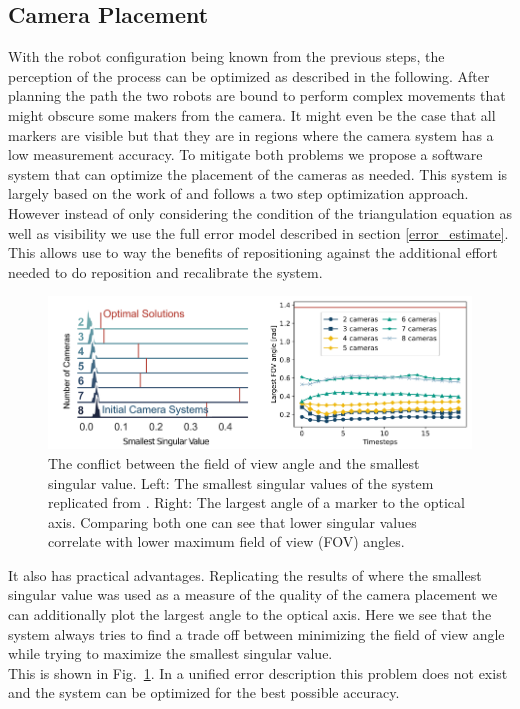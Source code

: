 \documentclass[5p,times,procedia]{elsarticle}
\begin{document}
\subsection{Camera Placement}
With the robot configuration being known from the previous steps, the perception of the process can be optimized as described in the following.
After planning the path the two robots are bound to perform complex movements that might obscure some makers from the camera.
It might even be the case that all markers are visible but that they are in regions where the camera system has a low measurement accuracy.
To mitigate both problems we propose a software system that can optimize the placement of the cameras as needed.
This system is largely based on the work of \cite{camera_placement} and follows a two step optimization approach.
However instead of only considering the condition of the triangulation equation as well as visibility we use the full error model described in section \ref{error_estimate}.
This allows use to way the benefits of repositioning against the additional effort needed to do reposition and recalibrate the system.
%
\begin{figure}[!htb]
	\centering
	\includegraphics[width=\columnwidth]{graphics/fov_sv_conflict.png}
	\caption{The conflict between the field of view angle and the smallest singular value. Left: The smallest singular values of the system replicated from \cite{camera_placement}. Right: The largest angle of a marker to the optical axis.
		Comparing both one can see that lower singular values correlate with lower maximum field of view (FOV) angles.}
	\label{fig:fov_sv_conflict}
\end{figure}
%
It also has practical advantages.
Replicating the results of \cite{camera_placement} where the smallest singular value was used as a measure of the quality of the camera placement we can additionally plot the largest angle to the optical axis.
Here we see that the system always tries to find a trade off between minimizing the field of view angle while trying to maximize the smallest singular value.\\
This is shown in Fig.~\ref{fig:fov_sv_conflict}.
In a unified error description this problem does not exist and the system can be optimized for the best possible accuracy.
%
%
\end{document}
